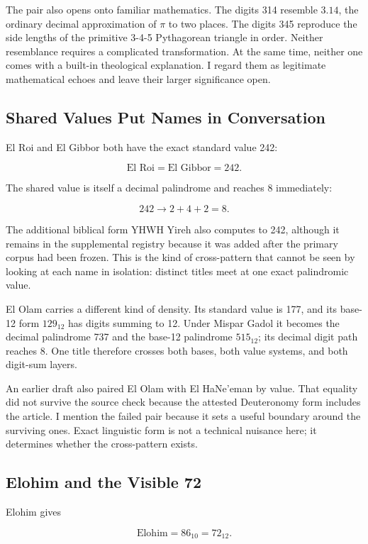 The pair also opens onto familiar mathematics. The digits 314 resemble $3.14$, the ordinary decimal approximation of $\pi$ to two places. The digits 345 reproduce the side lengths of the primitive 3-4-5 Pythagorean triangle in order. Neither resemblance requires a complicated transformation. At the same time, neither one comes with a built-in theological explanation. I regard them as legitimate mathematical echoes and leave their larger significance open.

\subsection{Shared Values Put Names in Conversation}

El Roi and El Gibbor both have the exact standard value 242:

\[
\text{El Roi}=\text{El Gibbor}=242.
\]

The shared value is itself a decimal palindrome and reaches 8 immediately:

\[
242\rightarrow2+4+2=8.
\]

The additional biblical form YHWH Yireh also computes to 242, although it remains in the supplemental registry because it was added after the primary corpus had been frozen. This is the kind of cross-pattern that cannot be seen by looking at each name in isolation: distinct titles meet at one exact palindromic value.

El Olam carries a different kind of density. Its standard value is 177, and its base-12 form $129_{12}$ has digits summing to 12. Under Mispar Gadol it becomes the decimal palindrome 737 and the base-12 palindrome $515_{12}$; its decimal digit path reaches 8. One title therefore crosses both bases, both value systems, and both digit-sum layers.

An earlier draft also paired El Olam with El HaNe'eman by value. That equality did not survive the source check because the attested Deuteronomy form includes the article. I mention the failed pair because it sets a useful boundary around the surviving ones. Exact linguistic form is not a technical nuisance here; it determines whether the cross-pattern exists.

\subsection{Elohim and the Visible 72}

Elohim gives

\[
\text{Elohim}=86_{10}=72_{12}.
\]

